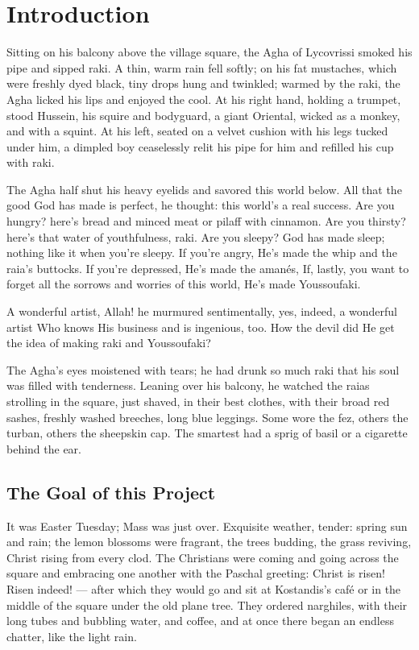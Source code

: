 \documentclass[diploma]{softlab-thesis}
\begin{document}
\englishtext

\chapter{Introduction}

Sitting on his balcony above the village square, the Agha of Lycovrissi
smoked his pipe and sipped raki. A thin, warm rain fell softly; on his fat
mustaches, which were freshly dyed black, tiny drops hung and twinkled;
warmed by the raki, the Agha licked his lips and enjoyed the cool. At his
right hand, holding a trumpet, stood Hussein, his squire and bodyguard, a
giant Oriental, wicked as a monkey, and with a squint. At his left, seated
on a velvet cushion with his legs tucked under him, a dimpled boy
ceaselessly relit his pipe for him and refilled his cup with raki.

The Agha half shut his heavy eyelids and savored this world below. All that
the good God has made is perfect, he thought: this world’s a real
success. Are you hungry? here’s bread and minced meat or pilaff with
cinnamon. Are you thirsty? here’s that water of youthfulness, raki. Are you
sleepy? God has made sleep; nothing like it when you’re sleepy. If you’re
angry, He’s made the whip and the raia’s buttocks. If you’re depressed, He’s
made the amanés, If, lastly, you want to forget all the sorrows and worries
of this world, He’s made Youssoufaki.

A wonderful artist, Allah! he murmured sentimentally, yes, indeed, a
wonderful artist Who knows His business and is ingenious, too. How the devil
did He get the idea of making raki and Youssoufaki?

The Agha’s eyes moistened with tears; he had drunk so much raki that his
soul was filled with tenderness. Leaning over his balcony, he watched the
raias strolling in the square, just shaved, in their best clothes, with
their broad red sashes, freshly washed breeches, long blue leggings. Some
wore the fez, others the turban, others the sheepskin cap. The smartest had
a sprig of basil or a cigarette behind the ear.


\section{The Goal of this Project}

It was Easter Tuesday; Mass was just over. Exquisite weather, tender: spring
sun and rain; the lemon blossoms were fragrant, the trees budding, the grass
reviving, Christ rising from every clod. The Christians were coming and
going across the square and embracing one another with the Paschal greeting:
Christ is risen! Risen indeed! --- after which they would go and sit at
Kostandis’s café or in the middle of the square under the old plane
tree. They ordered narghiles, with their long tubes and bubbling water, and
coffee, and at once there began an endless chatter, like the light rain.
\end{document}
